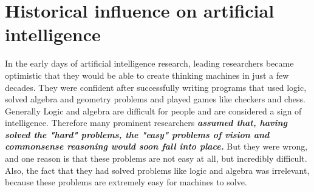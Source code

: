 \documentclass{article}
\begin{document}
\section{Historical influence on artificial intelligence}

In the early days of artificial intelligence research, leading researchers became optimistic that they would be able to create thinking machines in just a few decades. They were confident after successfully writing programs that used logic, solved algebra and geometry problems and played games like checkers and chess.\\

Generally Logic and algebra are difficult for people and are considered a sign of intelligence. Therefore many prominent researchers \textbf{\textit{assumed that, having solved the "hard" problems, the "easy" problems of vision and commonsense reasoning would soon fall into place.}}  But they were wrong, and one reason is that these problems are not easy at all, but incredibly difficult. Also, the fact that they had solved problems like logic and algebra was irrelevant, because these problems are extremely easy for machines to solve.
\end{document}
